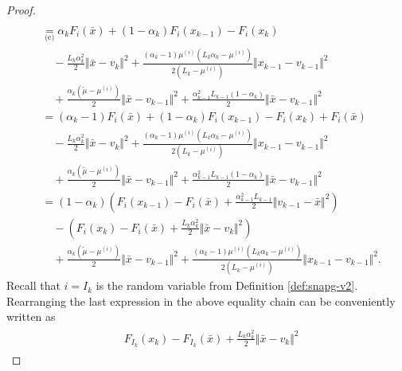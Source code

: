 \documentclass[12pt]{article}
\begin{document}
\begin{proof}
{\begin{align*}
            \\
            &\underset{\text{(e)}}{=} 
            \alpha_k F_i(\bar x) + (1 - \alpha_k)F_i(x_{k - 1}) - F_i(x_k) 
                \\&\quad 
                - \frac{L_k\alpha_k^2}{2}\Vert \bar x - v_k\Vert^2 
                + \frac{(\alpha_k - 1)\mu^{(i)}\left(L_k\alpha_k - \mu^{(i)}\right)}{2\left(L_k - \mu^{(i)}\right)}
                \Vert x_{k - 1} - v_{k - 1} \Vert^2
                \\ &\quad 
                + \frac{\alpha_k(\tilde\mu - \mu^{(i)})}{2} \Vert \bar x - v_{k - 1}\Vert^2
                + \frac{\alpha_{k - 1}^2L_{k - 1}(1 - \alpha_k)}{2} \Vert \bar x - v_{k - 1}\Vert^2
            \\
            &= (\alpha_k - 1)F_i(\bar x) + (1 - \alpha_k)F_i(x_{k - 1}) - F_i(x_k) + F_i(\bar x)
                \\&\quad 
                - \frac{L_k\alpha_k^2}{2}\Vert \bar x - v_k\Vert^2 
                + \frac{(\alpha_k - 1)\mu^{(i)}\left(L_k\alpha_k - \mu^{(i)}\right)}{2\left(L_k - \mu^{(i)}\right)}\Vert x_{k - 1} - v_{k - 1} \Vert^2
                \\ &\quad 
                + \frac{\alpha_k(\tilde\mu - \mu^{(i)})}{2} \Vert \bar x - v_{k - 1}\Vert^2
                + \frac{\alpha_{k - 1}^2L_{k - 1}(1 - \alpha_k)}{2} \Vert \bar x - v_{k - 1}\Vert^2
            \\
            &= (1 - \alpha_k)\left(
                F_i(x_{k - 1}) - F_i(\bar x) + \frac{\alpha_{k - 1}^2L_{k - 1}}{2}\Vert v_{k - 1} - \bar x\Vert^2
            \right) 
                \\ & \quad
                - \left(
                    F_i(x_{k}) - F_i(\bar x) + \frac{L_k\alpha_k^2}{2}\Vert \bar x - v_k\Vert^2 
                \right)
                \\ &\quad 
                + \frac{\alpha_k(\tilde\mu - \mu^{(i)})}{2}\Vert \bar x - v_{k - 1}\Vert^2
                + \frac{(\alpha_k - 1)\mu^{(i)}\left(L_k\alpha_k - \mu^{(i)}\right)}{2\left(L_k - \mu^{(i)}\right)}\Vert x_{k - 1} - v_{k - 1} \Vert^2. 
        \end{align*}
        }
        Recall that $i = I_k$ is the random variable from Definition \ref{def:snapg-v2}. 
        Rearranging the last expression in the above equality chain can be conveniently written as
        \begin{align}
            \begin{split}
                & F_{I_k}(x_{k}) - F_{I_k}(\bar x) + \frac{L_k\alpha_k^2}{2}\Vert \bar x - v_k\Vert^2 

\end{split}
\end{align}
\end{proof}
\end{document}
